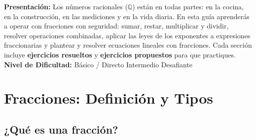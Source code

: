 \documentclass[12pt, letterpaper]{article}
\newcommand{\Q}{\mathbb{Q}}
\begin{document}


\vspace{4pt}
\begin{cuadroinfo}
  \small
  \textbf{Presentación:} Los números racionales ($\Q$) están en todas partes: en la cocina, en la construcción, en las mediciones y en la vida diaria. En esta guía aprenderás a operar con fracciones con seguridad: sumar, restar, multiplicar y dividir, resolver operaciones combinadas, aplicar las leyes de los exponentes a expresiones fraccionarias y plantear y resolver ecuaciones lineales con fracciones. Cada sección incluye \textbf{ejercicios resueltos} y \textbf{ejercicios propuestos} para que practiques.
  \\[4pt]
  \textbf{Nivel de Dificultad:}\quad
  \facil{} Básico / Directo \quad
  \medio{} Intermedio \quad
  \dificil{} Desafiante
\end{cuadroinfo}

\vspace{8pt}

\section{Fracciones: Definición y Tipos}

\subsection{¿Qué es una fracción?}
\end{document}
